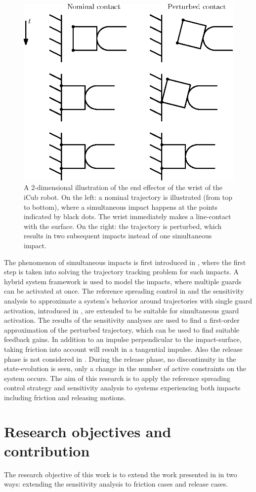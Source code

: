 \documentclass[../DC2017114Bouma.tex]{subfiles}
\begin{document}
\begin{figure}[hbt!]
\centering
\includegraphics[width=.45\textwidth]{simultaneous.eps}\caption{A 2-dimensional illustration of the end effector of the wrist of the iCub robot. On the left: a nominal trajectory is illustrated (from top to bottom), where a simultaneous impact happens at the points indicated by black dots. The wrist immediately makes a line-contact with the surface. On the right: the trajectory is perturbed, which results in two subsequent impacts instead of one simultaneous impact.}\label{fig:simultaneous}
\end{figure}

The phenomenon of simultaneous impacts is first introduced in \cite{Chen2018a}, where the first step is taken into solving the trajectory tracking problem for such impacts. A hybrid system framework is used to model the impacts, where multiple guards can be activated at once. The reference spreading control in \cite{Rijnen2016,Rijnen2017} and the sensitivity analysis to approximate a system's behavior around trajectories with single guard activation, introduced in \cite{Saccon2014}, are extended to be suitable for simultaneous guard activation. The results of the sensitivity analyses are used to find a first-order approximation of the perturbed trajectory, which can be used to find suitable feedback gains. In addition to an impulse perpendicular to the impact-surface, taking friction into account will result in a tangential impulse. Also the release phase is not considered in \cite{Chen2018a}. During the release phase, no discontinuity in the state-evolution is seen, only a change in the number of active constraints on the system occurs. The aim of this research is to apply the reference spreading control strategy and sensitivity analysis to systems experiencing both impacts including friction and releasing motions.

\section{Research objectives and contribution}
The research objective of this work is to extend the work presented in \cite{Rijnen2018} in two ways: extending the sensitivity analysis to friction cases and release cases.
\end{document}
